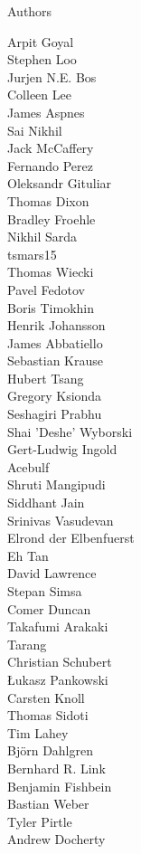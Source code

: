 \documentclass[xcolor=svgnames]{beamer}
\begin{document}
\begin{frame}{Authors}
\begin{multicols}{5}
Arpit Goyal\\
Stephen Loo\\
Jurjen N.E. Bos\\
Colleen Lee\\
James Aspnes\\
Sai Nikhil\\
Jack McCaffery\\
Fernando Perez\\
Oleksandr Gituliar\\
Thomas Dixon\\
Bradley Froehle\\
Nikhil Sarda\\
tsmars15\\
Thomas Wiecki\\
Pavel Fedotov\\
Boris Timokhin\\
Henrik Johansson\\
James Abbatiello\\
Sebastian Krause\\
Hubert Tsang\\
Gregory Ksionda\\
Seshagiri Prabhu\\
Shai 'Deshe' Wyborski\\
Gert-Ludwig Ingold\\
Acebulf\\
Shruti Mangipudi\\
Siddhant Jain\\
Srinivas Vasudevan\\
Elrond der Elbenfuerst\\
Eh Tan\\
David Lawrence\\
Stepan Simsa\\
Comer Duncan\\
Takafumi Arakaki\\
Tarang\\
Christian Schubert\\
Łukasz Pankowski\\
Carsten Knoll\\
Thomas Sidoti\\
Tim Lahey\\
Björn Dahlgren\\
Bernhard R. Link\\
Benjamin Fishbein\\
Bastian Weber\\
Tyler Pirtle\\
Andrew Docherty\\

\end{multicols}
\end{frame}
\end{document}
